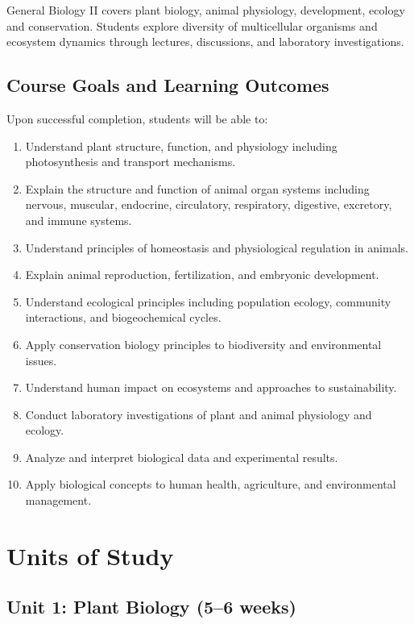 \documentclass[12pt,oneside]{book}
\begin{document}
General Biology II covers plant biology, animal physiology, development, ecology and conservation. Students explore diversity of multicellular organisms and ecosystem dynamics through lectures, discussions, and laboratory investigations.

\subsection{Course Goals and Learning Outcomes}

Upon successful completion, students will be able to:

\begin{enumerate}
    \item Understand plant structure, function, and physiology including photosynthesis and transport mechanisms.
    \item Explain the structure and function of animal organ systems including nervous, muscular, endocrine, circulatory, respiratory, digestive, excretory, and immune systems.
    \item Understand principles of homeostasis and physiological regulation in animals.
    \item Explain animal reproduction, fertilization, and embryonic development.
    \item Understand ecological principles including population ecology, community interactions, and biogeochemical cycles.
    \item Apply conservation biology principles to biodiversity and environmental issues.
    \item Understand human impact on ecosystems and approaches to sustainability.
    \item Conduct laboratory investigations of plant and animal physiology and ecology.
    \item Analyze and interpret biological data and experimental results.
    \item Apply biological concepts to human health, agriculture, and environmental management.
\end{enumerate}


\section{Units of Study}

\subsection{Unit 1: Plant Biology (5--6 weeks)}
\end{document}
